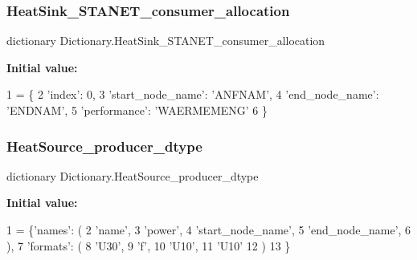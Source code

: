 \subsubsection{\texorpdfstring{Heat\+Sink\+\_\+\+S\+T\+A\+N\+E\+T\+\_\+consumer\+\_\+allocation}{HeatSink\_STANET\_consumer\_allocation}}
{\footnotesize\ttfamily dictionary Dictionary.\+Heat\+Sink\+\_\+\+S\+T\+A\+N\+E\+T\+\_\+consumer\+\_\+allocation}

{\bfseries Initial value\+:}
\begin{DoxyCode}
1 =  \{
2                                 \textcolor{stringliteral}{'index'}: 0,
3                                 \textcolor{stringliteral}{'start\_node\_name'}: \textcolor{stringliteral}{'ANFNAM'},
4                                 \textcolor{stringliteral}{'end\_node\_name'}: \textcolor{stringliteral}{'ENDNAM'},
5                                 \textcolor{stringliteral}{'performance'}: \textcolor{stringliteral}{'WAERMEMENG'}
6                                 \}
\end{DoxyCode}
\mbox{\label{namespace_dictionary_abeaeccad0ef3f237fd95ed21a43fa64e}} 
\subsubsection{\texorpdfstring{Heat\+Source\+\_\+producer\+\_\+dtype}{HeatSource\_producer\_dtype}}
{\footnotesize\ttfamily dictionary Dictionary.\+Heat\+Source\+\_\+producer\+\_\+dtype}

{\bfseries Initial value\+:}
\begin{DoxyCode}
1 =  \{\textcolor{stringliteral}{'names'}: (
2                                      \textcolor{stringliteral}{'name'},
3                                      \textcolor{stringliteral}{'power'},
4                                      \textcolor{stringliteral}{'start\_node\_name'},
5                                      \textcolor{stringliteral}{'end\_node\_name'},
6                                      ),
7                             \textcolor{stringliteral}{'formats'}: (
8                                         \textcolor{stringliteral}{'U30'},
9                                         \textcolor{stringliteral}{'f'},
10                                         \textcolor{stringliteral}{'U10'},
11                                         \textcolor{stringliteral}{'U10'}
12                                         )
13                             \}
\end{DoxyCode}
\mbox{\label{namespace_dictionary_a3edbaf1cfe1d45f0558ddc8cd934b6d3}} 
